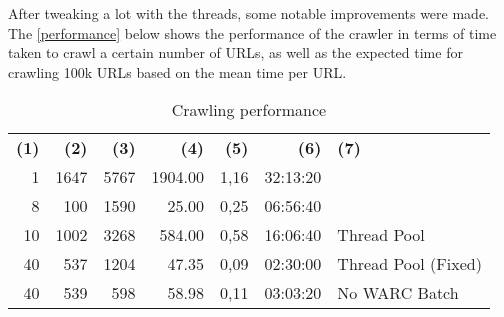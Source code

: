 After tweaking a lot with the threads, some notable improvements were made. The \autoref{performance} below shows the performance of the crawler in terms of time taken to crawl a certain number of URLs, as well as the expected time for crawling 100k URLs based on the mean time per URL.

\begin{table}[!ht] \centering
  \caption{Crawling performance} \label{performance}
  \begin{tabular}{rrrrrrl}
    \textbf{(1)} & \textbf{(2)} & \textbf{(3)} & \textbf{(4)} & \textbf{(5)} & \textbf{(6)}      & \textbf{(7)}             \\
    1            & 1647         & 5767         & 1904.00      & 1,16         & 32:13:20          &                          \\
    8            & 100          & 1590         & 25.00        & 0,25         & 06:56:40          &                          \\
    10           & 1002         & 3268         & 584.00       & 0,58         & 16:06:40          & Thread Pool              \\
    40           & 537          & 1204         & 47.35        & 0,09         & 02:30:00          & Thread Pool (Fixed)      \\
    40           & 539          & 598          & 58.98        & 0,11         & 03:03:20          & No WARC Batch            \\

\end{tabular}
\end{table}
